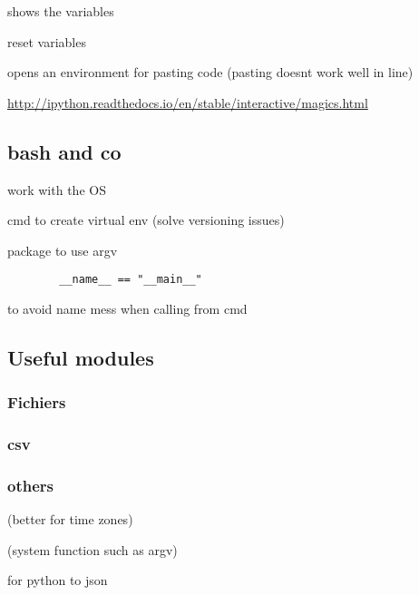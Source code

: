 			 shows the variables

			 reset variables

			 opens an environment for pasting code (pasting doesnt work well in line)

			\url{http://ipython.readthedocs.io/en/stable/interactive/magics.html}
	

	\subsection{bash and co}

		 work with the OS

		 cmd to create virtual env (solve versioning issues)

		 package to use argv

		\begin{lstlisting}
		__name__ == "__main__" 
		\end{lstlisting}  
		to avoid name mess when calling from cmd

	\subsection{Useful modules}

		\subsubsection{Fichiers}


			\subsubsection{csv}



		\subsubsection{others}
			

			 (better for time zones)

			 (system function such as argv)


			 for python to json 

